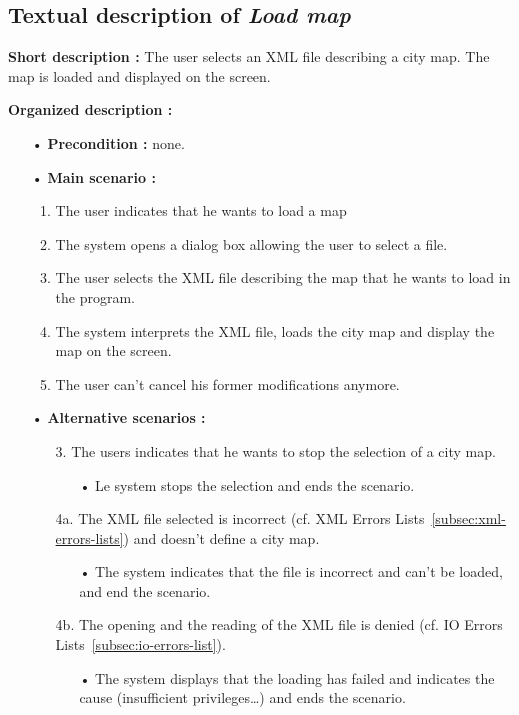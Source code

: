 \documentclass[paper=a4,fontsize=11pt]{report}
\numberwithin{equation}{section}		%
\numberwithin{figure}{section}		%
\numberwithin{table}{section}		%
\renewcommand{\it}[1]{\textit{#1}}
\begin{document}
\subsection{Textual description of \it{Load map}}
\label{subsec:textual-description-of-load-map}

\textbf{Short description :} The user selects an XML file describing a city map. The map is loaded and displayed on the screen.

\textbf{Organized description :}

\begin{itemize}
  \item[•] \textbf{Precondition :} none.
  \item[•] \textbf{Main scenario :}
  \begin{enumerate}
    \item The user indicates that he wants to load a map
    \item The system opens a dialog box allowing the user to select a file.
    \item The user selects the XML file describing the map that he wants to load in the program.
    \item The system interprets the XML file, loads the city map and display the map on the screen.
    \item The user can’t cancel his former modifications anymore.
  \end{enumerate}
  \item[•] \textbf{Alternative scenarios :}
  \begin{itemize}
    \item[3.] The users indicates that he wants to stop the selection of a city map.
    \begin{itemize}
      \item[•] Le system stops the selection and ends the scenario.
    \end{itemize}
    \item[4a.] The XML file selected is incorrect (cf. XML Errors Lists~\ref{subsec:xml-errors-lists}) and doesn’t define a city map.
    \begin{itemize}
      \item[•] The system indicates that the file is incorrect and can’t be loaded, and end the scenario.
    \end{itemize}
    \item[4b.] The opening and the reading of the XML file is denied (cf. IO Errors Lists~\ref{subsec:io-errors-list}).
    \begin{itemize}
      \item[•] The system displays that the loading has failed and indicates the cause (insufficient privileges…) and ends the scenario.
    \end{itemize}
  \end{itemize}
\end{itemize}
\end{document}
